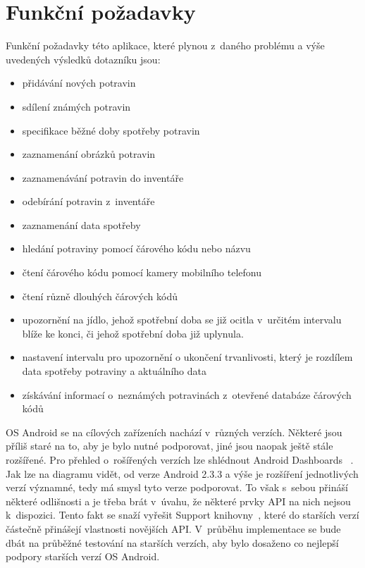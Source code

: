\documentclass[thesis=B,czech]{FITthesis}[2013/10/20]
\begin{document}
\section{Funkční požadavky}

Funkční požadavky této aplikace, které plynou z~daného problému a výše uvedených výsledků dotazníku jsou:
\begin{itemize}
  \item přidávání nových potravin
  \item sdílení známých potravin
  \item specifikace běžné doby spotřeby potravin
  \item zaznamenání obrázků potravin
  \item zaznamenávání potravin do inventáře
  \item odebírání potravin z~inventáře
  \item zaznamenání data spotřeby
  \item hledání potraviny pomocí čárového kódu nebo názvu
  \item čtení čárového kódu pomocí kamery mobilního telefonu
  \item čtení různě dlouhých čárových kódů
  \item upozornění na jídlo, jehož spotřební doba se již ocitla v~určitém intervalu blíže ke konci, či jehož spotřební doba již uplynula.
  \item nastavení intervalu pro upozornění o ukončení trvanlivosti, který je rozdílem data spotřeby potraviny a aktuálního data
  \item získávání informací o~neznámých potravinách z~otevřené databáze čárových kódů
\end{itemize}

OS Android se na cílových zařízeních nachází v~různých verzích. Některé jsou příliš staré na to, aby je bylo nutné podporovat, jiné jsou naopak ještě stále rozšířené. Pro přehled o~rošířených verzích lze shlédnout Android Dashboards ~\cite{dashboards}. Jak lze na diagramu vidět, od verze Android 2.3.3 a výše je rozšíření jednotlivých verzí významné, tedy má smysl tyto verze podporovat. To však s~sebou přináší některé odlišnosti a je třeba brát v~úvahu, že některé prvky API na nich nejsou k~dispozici. Tento fakt se snaží vyřešit Support knihovny~\cite{support}, které do starších verzí částečně přinášejí vlastnosti novějších API. V~průběhu implementace se bude dbát na průběžné testování na starších verzích, aby bylo dosaženo co nejlepší podpory starších verzí OS Android.
\end{document}
